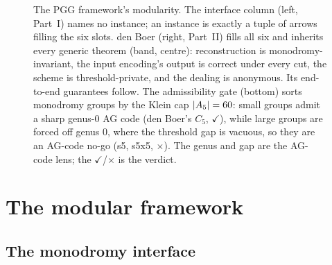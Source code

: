 \begin{figure}[t]
\caption{The PGG framework's modularity. The interface column (left, Part~I)
names no instance; an instance is exactly a tuple of arrows filling the six
slots. den Boer (right, Part~II) fills all six and inherits every generic
theorem (band, centre): reconstruction is monodromy-invariant, the input
encoding's output is correct under every cut, the scheme is threshold-private,
and the dealing is anonymous. Its end-to-end guarantees follow. The
admissibility gate (bottom) sorts monodromy groups by the Klein cap $|A_5|=60$:
small groups admit a sharp genus-0 AG code (den Boer's $C_5$, $\checkmark$), while
large groups are forced off genus 0, where the threshold gap is vacuous, so they
are an AG-code no-go (s5, s5x5, $\times$). The genus and gap are the AG-code
lens; the $\checkmark$/$\times$ is the verdict.}
\label{fig:bp:modularity}
\end{figure}

\part{The modular framework}

\chapter{The monodromy interface}

